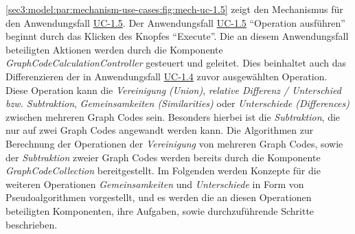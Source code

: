 \cref{sec3:model:par:mechanism-use-cases:fig:mech-uc-1.5} zeigt den Mechanismus für den Anwendungsfall \hyperref[sec3:model:uc-1.5]{UC-1.5}.
Der Anwendungsfall \hyperref[sec3:model:uc-1.5]{UC-1.5} \enquote{Operation ausführen} beginnt durch das Klicken des Knopfes \enquote{Execute}.
Die an diesem Anwendungsfall beteiligten Aktionen werden durch die Komponente \textit{GraphCodeCalculationController} gesteuert und geleitet.
Dies beinhaltet auch das Differenzieren der in Anwendungsfall \hyperref[sec3:model:uc-1.4]{UC-1.4} zuvor ausgewählten Operation.
Diese Operation kann die \textit{Vereinigung (Union)}, \textit{relative Differenz / Unterschied bzw. Subtraktion}, \textit{Gemeinsamkeiten (Similarities)} oder \textit{Unterschiede (Differences) }zwischen mehreren Graph Codes sein.
Besonders hierbei ist die \textit{Subtraktion}, die nur auf zwei Graph Codes angewandt werden kann.
Die Algorithmen zur Berechnung der Operationen der \textit{Vereinigung} von mehreren Graph Codes, sowie der \textit{Subtraktion} zweier Graph Codes werden bereits durch die Komponente \textit{GraphCodeCollection} bereitgestellt.
Im Folgenden werden Konzepte für die weiteren Operationen \textit{Gemeinsamkeiten} und \textit{Unterschiede} in Form von Pseudoalgorithmen vorgestellt, und es werden die an diesen Operationen beteiligten Komponenten, ihre Aufgaben, sowie durchzuführende Schritte beschrieben.



